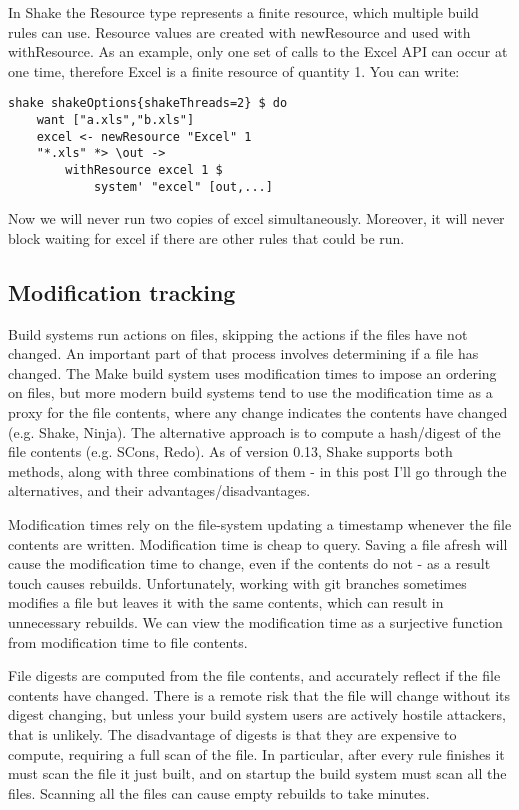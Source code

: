 In Shake the Resource type represents a finite resource, which multiple build rules can use. Resource values are created with newResource and used with withResource. As an example, only one set of calls to the Excel API can occur at one time, therefore Excel is a finite resource of quantity 1. You can write:

\begin{lstlisting}
shake shakeOptions{shakeThreads=2} $ do
    want ["a.xls","b.xls"]
    excel <- newResource "Excel" 1
    "*.xls" *> \out ->
        withResource excel 1 $
            system' "excel" [out,...]
\end{lstlisting}

Now we will never run two copies of excel simultaneously. Moreover, it will never block waiting for excel if there are other rules that could be run.

\subsection{Modification tracking}

Build systems run actions on files, skipping the actions if the files have not changed. An important part of that process involves determining if a file has changed. The Make build system uses modification times to impose an ordering on files, but more modern build systems tend to use the modification time as a proxy for the file contents, where any change indicates the contents have changed (e.g. Shake, Ninja). The alternative approach is to compute a hash/digest of the file contents (e.g. SCons, Redo). As of version 0.13, Shake supports both methods, along with three combinations of them - in this post I'll go through the alternatives, and their advantages/disadvantages.

Modification times rely on the file-system updating a timestamp whenever the file contents are written. Modification time is cheap to query. Saving a file afresh will cause the modification time to change, even if the contents do not - as a result touch causes rebuilds. Unfortunately, working with git branches sometimes modifies a file but leaves it with the same contents, which can result in unnecessary rebuilds. We can view the modification time as a surjective function from modification time to file contents.

File digests are computed from the file contents, and accurately reflect if the file contents have changed. There is a remote risk that the file will change without its digest changing, but unless your build system users are actively hostile attackers, that is unlikely. The disadvantage of digests is that they are expensive to compute, requiring a full scan of the file. In particular, after every rule finishes it must scan the file it just built, and on startup the build system must scan all the files. Scanning all the files can cause empty rebuilds to take minutes.

